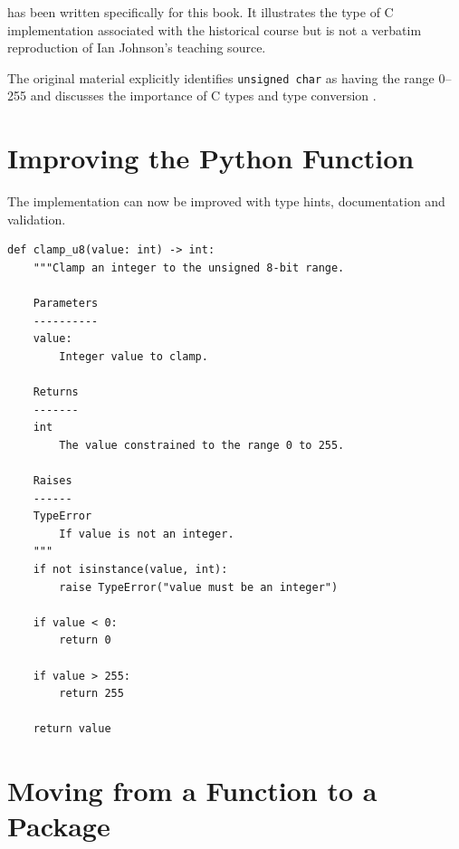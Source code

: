 \begin{historicalnote}
 has been written specifically for this book.
It illustrates the type of C implementation associated with the
historical course but is not a verbatim reproduction of Ian Johnson's
teaching source.

The original material explicitly identifies
\texttt{unsigned char} as having the range 0--255 and discusses
the importance of C types and type conversion
\cite{johnson_uqc146_intro,johnson_uqc146_c2}.
\end{historicalnote}


\section{Improving the Python Function}
\label{sec:improving-clamp}

The implementation can now be improved with type hints,
documentation and validation.

\begin{listing}[htbp]
    \caption{The documented and validated
    \texttt{clamp\_u8()} function.}
    \label{lst:clamp-u8-final}

\begin{verbatim}
def clamp_u8(value: int) -> int:
    """Clamp an integer to the unsigned 8-bit range.

    Parameters
    ----------
    value:
        Integer value to clamp.

    Returns
    -------
    int
        The value constrained to the range 0 to 255.

    Raises
    ------
    TypeError
        If value is not an integer.
    """
    if not isinstance(value, int):
        raise TypeError("value must be an integer")

    if value < 0:
        return 0

    if value > 255:
        return 255

    return value
\end{verbatim}

\end{listing}


\section{Moving from a Function to a Package}
\label{sec:first-package}


